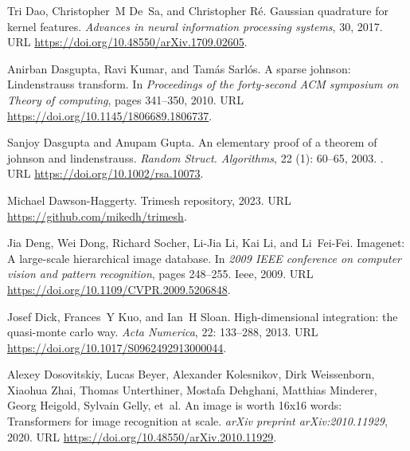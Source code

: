 \begin{thebibliography}{76}
Tri Dao, Christopher~M De~Sa, and Christopher R{\'e}.
\newblock Gaussian quadrature for kernel features.
\newblock \emph{Advances in neural information processing systems}, 30, 2017.
\newblock URL \url{https://doi.org/10.48550/arXiv.1709.02605}.

Anirban Dasgupta, Ravi Kumar, and Tam{\'a}s Sarl{\'o}s.
\newblock A sparse johnson: Lindenstrauss transform.
\newblock In \emph{Proceedings of the forty-second ACM symposium on Theory of computing}, pages 341--350, 2010.
\newblock URL \url{https://doi.org/10.1145/1806689.1806737}.

Sanjoy Dasgupta and Anupam Gupta.
\newblock An elementary proof of a theorem of johnson and lindenstrauss.
\newblock \emph{Random Struct. Algorithms}, 22 (1): 60--65, 2003.
\newblock {}.
\newblock URL \url{https://doi.org/10.1002/rsa.10073}.

Michael Dawson-Haggerty.
\newblock Trimesh repository, 2023.
\newblock URL \url{https://github.com/mikedh/trimesh}.

Jia Deng, Wei Dong, Richard Socher, Li-Jia Li, Kai Li, and Li~Fei-Fei.
\newblock Imagenet: A large-scale hierarchical image database.
\newblock In \emph{2009 IEEE conference on computer vision and pattern recognition}, pages 248--255. Ieee, 2009.
\newblock URL \url{https://doi.org/10.1109/CVPR.2009.5206848}.

Josef Dick, Frances~Y Kuo, and Ian~H Sloan.
\newblock High-dimensional integration: the quasi-monte carlo way.
\newblock \emph{Acta Numerica}, 22: 133--288, 2013.
\newblock URL \url{https://doi.org/10.1017/S0962492913000044}.

Alexey Dosovitskiy, Lucas Beyer, Alexander Kolesnikov, Dirk Weissenborn, Xiaohua Zhai, Thomas Unterthiner, Mostafa Dehghani, Matthias Minderer, Georg Heigold, Sylvain Gelly, et~al.
\newblock An image is worth 16x16 words: Transformers for image recognition at scale.
\newblock \emph{arXiv preprint arXiv:2010.11929}, 2020.
\newblock URL \url{https://doi.org/10.48550/arXiv.2010.11929}.


\end{thebibliography}
